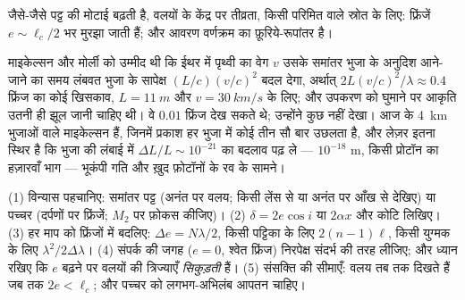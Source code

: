 \begin{omfigure}

{\small जैसे-जैसे पट्ट की मोटाई बढ़ती है, वलयों के केंद्र पर तीव्रता,
किसी परिमित  वाले स्रोत के लिए: फ्रिंजें
$e \sim \ell_c/2$ भर मुरझा जाती हैं; और आवरण वर्णक्रम का फ़ूरिये-रूपांतर है।}
\end{omfigure}

\begin{remark}[वे भुजाएँ जिन्होंने कुछ नहीं नापा, और वे जिन्होंने कोई तरंग नापी]\label{rem:b2:michelson:history}
माइकेल्सन और मोर्ली को उम्मीद थी कि ईथर में पृथ्वी का वेग $v$
उसके समांतर भुजा के अनुदिश आने-जाने का समय लंबवत भुजा के सापेक्ष
$(L/c)(v/c)^2$ बदल देगा, अर्थात् $2L(v/c)^2/\lambda \approx 0.4$ फ्रिंज का कोई
खिसकाव, $L = \qty{11}{m}$ और $v = \qty{30}{km/s}$ के लिए;
और उपकरण को घुमाने पर आकृति उतनी ही झूल जानी चाहिए थी।
वे $0.01$ फ्रिंज देख सकते थे; उन्होंने कुछ नहीं देखा। आज के  \qty{4}{km} भुजाओं वाले माइकेल्सन हैं, जिनमें प्रकाश हर भुजा में
कोई तीन सौ बार उछलता है, और लेज़र इतना स्थिर है कि भुजा की लंबाई में
$\Delta L/L \sim 10^{-21}$ का बदलाव पढ़ ले --- $10^{-18}$ m, किसी प्रोटॉन का
हज़ारवाँ भाग --- भूकंपी गति और ख़ुद फ़ोटॉनों के रव के सामने।
\end{remark}

\begin{method}[माइकेल्सन काम में लेना]\label{met:b2:michelson:method}
(1) विन्यास पहचानिए: समांतर पट्ट (अनंत पर वलय; किसी लेंस से या
अनंत पर आँख से देखिए) या पच्चर (दर्पणों पर फ्रिंजें;
$M_2$ पर फ़ोकस कीजिए)। (2) $\delta = 2e\cos i$ या $2\alpha x$ और
कोटि लिखिए। (3) हर माप को फ्रिंजों में बदलिए: $\Delta e = N\lambda/2$,
किसी पट्टिका के लिए $2(n - 1)\ell$, किसी युग्मक के लिए $\lambda^2/2\Delta\lambda$। (4) संपर्क
की जगह ($e = 0$, श्वेत फ्रिंज) निरपेक्ष संदर्भ की तरह लीजिए;
और ध्यान रखिए कि $e$ बढ़ने पर वलयों की त्रिज्याएँ \emph{सिकुड़ती} हैं। (5) संसक्ति
की सीमाएँ: वलय तब तक दिखते हैं जब तक $2e < \ell_c$; और पच्चर को
लगभग-अभिलंब आपतन चाहिए।
\end{method}

